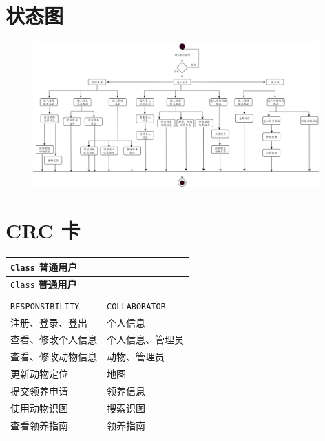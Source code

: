 \documentclass[12pt,a4paper,UTF8]{article}
\begin{document}
\section{状态图}

\begin{figure}[H]
  \centering
  \includegraphics[width=0.98\textwidth]{figures/state.png}
\end{figure}

\section{CRC 卡}

\begin{xltabular}{\linewidth}{|>{\raggedright\arraybackslash}p{8cm}|>{\raggedright\arraybackslash}p{4cm}|}
  \hline
  \verb|Class| \textbf{普通用户} &  \\ \hline \endfirsthead
  \hline
  \verb|Class| \textbf{普通用户} &  \\ \hline \endhead
  \hline
   \\ \endfoot
  \hline \endlastfoot

  \verb|RESPONSIBILITY| & \verb|COLLABORATOR| \\ \hline
  注册、登录、登出 & 个人信息 \\ \hline
  查看、修改个人信息 & 个人信息、管理员 \\ \hline
  查看、修改动物信息 & 动物、管理员 \\ \hline
  更新动物定位 & 地图 \\ \hline
  提交领养申请 & 领养信息 \\ \hline
  使用动物识图 & 搜索识图 \\ \hline 
  查看领养指南 & 领养指南 \\ \hline
\end{xltabular}

\vspace{1cm}
\end{document}
